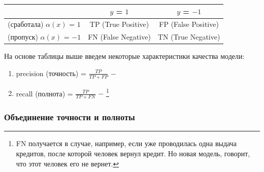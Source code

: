 
        \begin{table}[ht]
            \centering
            \begin{tabular}{|c|c|c|}
            \hline
             & $y$ = $1$ & $y$ = $-1$ \\
            \hline
            (сработала) $\alpha(x)$ = $1$ & TP (True Positive) & FP (False Positive)\\
            \hline
            (пропуск) $\alpha(x)$ = $-1$ & FN (False Negative) & TN (True Negative)\\
            \hline
            \end{tabular}
        \end{table}

        На основе таблицы выше введем некоторые характеристики качества модели:
        \begin{enumerate}
            \item precision  (точность) = $\frac{TP}{TP + FP}$ $-$ 

            \item recall (полнота) = $\frac{TP}{TP + FN}$ $-$ \footnote{FN получается в случае, например, если уже проводилась одна выдача кредитов, после которой человек вернул кредит. Но новая модель, говорит, что этот человек его не вернет.}
        \end{enumerate}

        \subsubsection{Объединение точности и полноты}

